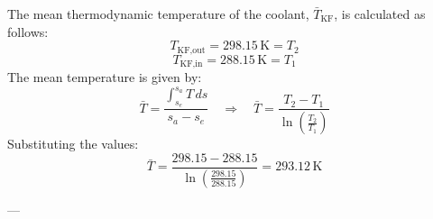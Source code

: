 The mean thermodynamic temperature of the coolant, \( \bar{T}_{\text{KF}} \), is calculated as follows:  
\[
T_{\text{KF,out}} = 298.15 \, \text{K} = T_{2}
\]  
\[
T_{\text{KF,in}} = 288.15 \, \text{K} = T_{1}
\]  
The mean temperature is given by:  
\[
\bar{T} = \frac{\int_{s_e}^{s_a} T \, ds}{s_a - s_e} \quad \Rightarrow \quad \bar{T} = \frac{T_2 - T_1}{\ln\left(\frac{T_2}{T_1}\right)}
\]  
Substituting the values:  
\[
\bar{T} = \frac{298.15 - 288.15}{\ln\left(\frac{298.15}{288.15}\right)} = 293.12 \, \text{K}
\]  

---